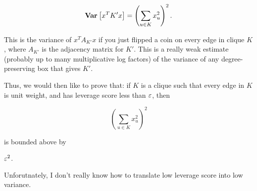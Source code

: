 \[\mbox{\bf Var}_{}\left[ x^T K' x \right] = \left(\sum_{u \in K} x_u^2\right)^2.\]

This is the variance of $x^T A_{K'} x$ if you just flipped a coin on
every edge in clique $K$,  where $A_{K'}$ is the adjacency matrix for
$K'$. This is a really weak estimate (probably up to many multiplicative
log factors) of the variance of any degree-preserving box that gives
$K'$.

Thus, we would then like to prove that: if $K$ is a clique such that
every edge in $K$ is unit weight, and has leverage score less than
$\varepsilon$, then 

\[ \left(\sum_{u \in K} x_u^2 \right)^2 \]

is bounded above by

$ \varepsilon^2$.

Unforutnately, I don't really know how to translate low leverage score
into low variance.


